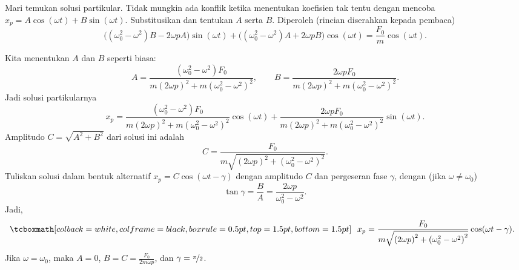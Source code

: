 \pagebreak[2]
Mari temukan solusi partikular. Tidak mungkin ada konflik ketika menentukan koefisien tak tentu dengan mencoba $x_p = A \cos (\omega t) + B \sin (\omega t)$.
Substitusikan dan tentukan $A$ serta $B$. Diperoleh (rincian  %
diserahkan kepada pembaca)
\begin{equation*}
\bigl((\omega_0^2  - \omega^2)B - 2\omega p A\bigr) \sin (\omega t)
+
\bigl((\omega_0^2  - \omega^2)A + 2\omega p B\bigr) \cos (\omega t)
=
\frac{F_0}{m} \cos (\omega t) .
\end{equation*}

Kita menentukan $A$ dan $B$ seperti biasa:
\begin{equation*}
A=\frac{(\omega_0^2-\omega^2) F_0}
{m{(2\omega p)}^2+m{(\omega_0^2-\omega^2)}^2} ,
\qquad B=\frac{2 \omega p F_0}
{m{(2\omega p)}^2+m{(\omega_0^2-\omega^2)}^2} .
\end{equation*}
Jadi solusi partikularnya
\begin{equation*}
x_p =
\frac{(\omega_0^2-\omega^2) F_0}
{m{(2\omega p)}^2+m{(\omega_0^2-\omega^2)}^2} \cos (\omega t) +
\frac{2 \omega p F_0}
{m{(2\omega p)}^2+m{(\omega_0^2-\omega^2)}^2} \sin (\omega t) .
\end{equation*}
Amplitudo $C = \sqrt{A^2+B^2}$ dari solusi ini adalah
\begin{equation*}
C = \frac{F_0}{m \sqrt{{(2\omega p)}^2+{(\omega_0^2-\omega^2)}^2}} .
\end{equation*}
Tuliskan solusi dalam bentuk alternatif $x_p = C \cos(\omega t - \gamma)$ dengan amplitudo $C$ dan pergeseran fase $\gamma$, dengan (jika $\omega \neq \omega_0$)
\begin{equation*}
\tan \gamma = \frac{B}{A} = \frac{2\omega p}{\omega_0^2-\omega^2} .
\end{equation*}
Jadi,
\begin{equation*}
\mybxbg{~~
x_p =
\frac{F_0}{m \sqrt{{(2\omega p)}^2+{(\omega_0^2-\omega^2)}^2}}
\cos ( \omega t - \gamma ) .
~~}
\end{equation*}
Jika $\omega = \omega_0$, maka $A=0$, $B = C = \frac{F_0}{2m\omega p}$, dan $\gamma = \nicefrac{\pi}{2}$.



